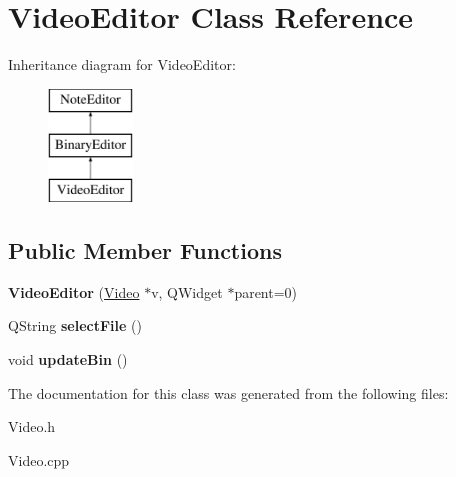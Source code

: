 \hypertarget{classVideoEditor}{\section{\-Video\-Editor \-Class \-Reference}
\label{classVideoEditor}
}
\-Inheritance diagram for \-Video\-Editor\-:\begin{figure}[H]
\begin{center}
\leavevmode
\includegraphics[height=3.000000cm]{classVideoEditor}
\end{center}
\end{figure}
\subsection*{\-Public \-Member \-Functions}
\begin{DoxyCompactItemize}
\item 
\hypertarget{classVideoEditor_a05925389f4dd395bbd43605481326018}{{\bfseries \-Video\-Editor} (\hyperlink{classVideo}{\-Video} $\ast$v, \-Q\-Widget $\ast$parent=0)}\label{classVideoEditor_a05925389f4dd395bbd43605481326018}

\item 
\hypertarget{classVideoEditor_a856f5c81afa9fb9e339ca67414c8a8aa}{\-Q\-String {\bfseries select\-File} ()}\label{classVideoEditor_a856f5c81afa9fb9e339ca67414c8a8aa}

\item 
\hypertarget{classVideoEditor_a01cad2eadd5d701c248d5b390cd5318a}{void {\bfseries update\-Bin} ()}\label{classVideoEditor_a01cad2eadd5d701c248d5b390cd5318a}

\end{DoxyCompactItemize}


\-The documentation for this class was generated from the following files\-:\begin{DoxyCompactItemize}
\item 
\-Video.\-h\item 
\-Video.\-cpp\end{DoxyCompactItemize}

